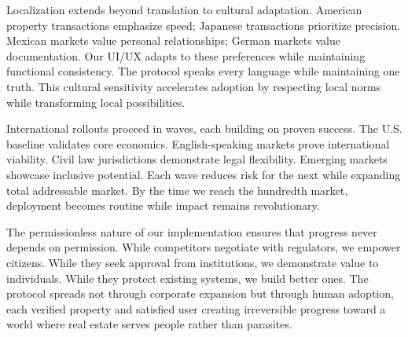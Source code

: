 Localization extends beyond translation to cultural adaptation. American property transactions emphasize speed; Japanese transactions prioritize precision. Mexican markets value personal relationships; German markets value documentation. Our UI/UX adapts to these preferences while maintaining functional consistency. The protocol speaks every language while maintaining one truth. This cultural sensitivity accelerates adoption by respecting local norms while transforming local possibilities.

International rollouts proceed in waves, each building on proven success. The U.S. baseline validates core economics. English-speaking markets prove international viability. Civil law jurisdictions demonstrate legal flexibility. Emerging markets showcase inclusive potential. Each wave reduces risk for the next while expanding total addressable market. By the time we reach the hundredth market, deployment becomes routine while impact remains revolutionary.

The permissionless nature of our implementation ensures that progress never depends on permission. While competitors negotiate with regulators, we empower citizens. While they seek approval from institutions, we demonstrate value to individuals. While they protect existing systems, we build better ones. The protocol spreads not through corporate expansion but through human adoption, each verified property and satisfied user creating irreversible progress toward a world where real estate serves people rather than parasites.